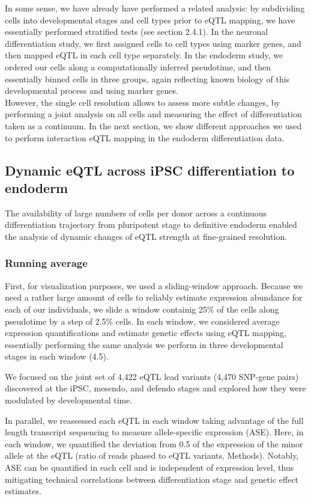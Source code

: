 In some sense, we have already have performed a related analysis: by subdividing cells into developmental stages and cell types prior to eQTL mapping, we have essentially performed stratified tests (see section 2.4.1).
In the neuronal differentiation study, we first assigned cells to cell types using marker genes, and then mapped eQTL in each cell type separately.
In the endoderm study, we ordered our cells along a computationally inferred pseudotime, and then essentially binned cells in three groups, again reflecting known biology of this developmental process and using marker genes.\\

However, the single cell resolution allows to assess more subtle changes, by performing a joint analysis on all cells and measuring the effect of differentiation taken as a continuum.
In the next section, we show different approaches we used to perform interaction eQTL mapping in the endoderm differentiation data.

\subsection{Dynamic eQTL across iPSC differentiation to endoderm}

The availability of large numbers of cells per donor across a continuous differentiation trajectory from pluripotent stage to definitive endoderm enabled the analysis of dynamic changes of eQTL strength at fine-grained resolution. 

\subsubsection{Running average}

First, for visualization purposes, we used a sliding-window approach. 
Because we need a rather large amount of cells to reliably estimate expression abundance for each of our individuals, we slide a window containig 25\% of the cells along pseudotime by a step of 2.5\% cells.
In each window, we considered average expression quantifications and estimate genetic effects using eQTL mapping, essentially performing the same analysis we perform in three developmental stages in each window (4.5). 

We focused on the joint set of 4,422 eQTL lead variants (4,470 SNP-gene pairs) discovered at the iPSC, mesendo, and defendo stages and explored how they were modulated by developmental time.

In parallel, we reassessed each eQTL in each window taking advantage of the full length transcript sequencing to measure allele-specific expression (ASE).
Here, in each window, we quantified the deviation from 0.5 of the expression of the minor allele at the eQTL (ratio of reads phased to eQTL variants, Methods). 
Notably, ASE can be quantified in each cell and is independent of expression level, thus mitigating technical correlations between differentiation stage and genetic effect estimates.


